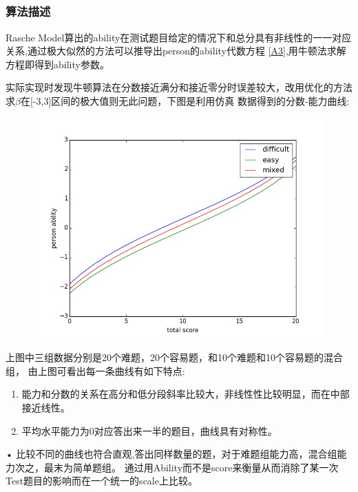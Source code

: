 \documentclass[12pt]{article}
\begin{document}
\subsection{\textbf{}}
\subsubsection{算法描述}
Rasche Model算出的ability在测试题目给定的情况下和总分具有非线性的一一对应关系,通过极大似然的方法可以推导出person的ability代数方程
\ref{A3},用牛顿法求解方程即得到ability参数。

实际实现时发现牛顿算法在分数接近满分和接近零分时误差较大，改用优化的方法求$\beta$在[-3,3]区间的极大值则无此问题，下图是利用仿真
数据得到的分数-能力曲线:
\begin{figure}[!ht]
\includegraphics[width=\linewidth]{scoring.png}
\end{figure}

上图中三组数据分别是20个难题，20个容易题，和10个难题和10个容易题的混合组，
由上图可看出每一条曲线有如下特点:
\begin{enumerate}
\item{能力和分数的关系在高分和低分段斜率比较大，非线性性比较明显，而在中部接近线性。}
\item{平均水平能力为0对应答出来一半的题目，曲线具有对称性。}
\end{enumerate}•
比较不同的曲线也符合直观,答出同样数量的题，对于难题组能力高，混合组能力次之，最末为简单题组。
通过用Ability而不是score来衡量从而消除了某一次Test题目的影响而在一个统一的scale上比较。
\end{document}

